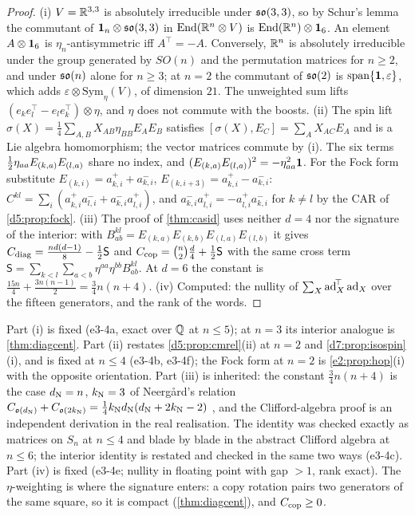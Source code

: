 \begin{proof}
(i) $V=\mathbb{R}^{3,3}$ is absolutely irreducible under $\mathfrak{so}(3,3)$, so by Schur's lemma the commutant of $\mathbf 1_n\otimes\mathfrak{so}(3,3)$ in $\operatorname{End}(\mathbb{R}^n\otimes V)$ is
$\operatorname{End}(\mathbb{R}^n)\otimes\mathbf 1_6$. An element $A\otimes\mathbf 1_6$ is $\eta_n$-antisymmetric iff $A^{\!\top}=-A$. Conversely, $\mathbb{R}^n$ is absolutely irreducible under
the group generated by $SO(n)$ and the permutation matrices for $n\ge2$, and under $\mathfrak{so}(n)$ alone for $n\ge3$; at $n=2$ the commutant of $\mathfrak{so}(2)$
is $\operatorname{span}\{\mathbf 1,\varepsilon\}$, which adds $\varepsilon\otimes\mathrm{Sym}_\eta(V)$, of dimension $21$. The unweighted sum lifts
$(e_ke_l^{\!\top}-e_le_k^{\!\top})\otimes\eta$, and $\eta$ does not commute with the boosts. (ii) The spin lift $\sigma(X)=\tfrac14\sum_{A,B}X_{AB}\eta_{BB}E_AE_B$
satisfies $[\sigma(X),E_C]=\sum_AX_{AC}E_A$ and is a Lie algebra homomorphism; the vector matrices commute by (i). The six terms
$\tfrac12\eta_{aa}E_{(k,a)}E_{(l,a)}$ share no index, and $(E_{(k,a)}E_{(l,a)})^2=-\eta_{aa}^2\mathbf 1$. For the Fock form substitute
$E_{(k,i)}=a^+_{k,i}+a^-_{k,i}$, $E_{(k,i+3)}=a^+_{k,i}-a^-_{k,i}$: $C^{kl}=\sum_i(a^+_{k,i}a^-_{l,i}+a^-_{k,i}a^+_{l,i})$, and $a^-_{k,i}a^+_{l,i}=-a^+_{l,i}a^-_{k,i}$ for
$k\ne l$ by the CAR of \cref{d5:prop:fock}. (iii) The proof of \cref{thm:casid} uses neither $d=4$ nor the signature of the
interior: with $B^{kl}_{ab}=E_{(k,a)}E_{(k,b)}E_{(l,a)}E_{(l,b)}$ it gives $C_{\rm diag}=\tfrac{nd(d-1)}8-\tfrac12\mathsf S$ and $C_{\rm cop}=\binom n2\tfrac d4+\tfrac12\mathsf S$
with the same cross term $\mathsf S=\sum_{k<l}\sum_{a<b}\eta^{aa}\eta^{bb}B^{kl}_{ab}$. At $d=6$ the constant is $\tfrac{15n}4+\tfrac{3n(n-1)}2=\tfrac34n(n+4)$.
(iv) Computed: the nullity of $\sum_X\operatorname{ad}_X^{\!\top}\operatorname{ad}_X$ over the fifteen generators, and the rank of the words.
\end{proof}

Part (i) is fixed (e3-4a, exact over $\mathbb{Q}$ at $n\le5$); at $n=3$ its interior analogue is \cref{thm:diagcent}. Part (ii) restates
\cref{d5:prop:cmrel}(ii) at $n=2$ and \cref{d7:prop:isospin}(i), and is fixed at $n\le4$ (e3-4b, e3-4f); the Fock form at $n=2$ is
\cref{e2:prop:hop}(i) with the opposite orientation. Part (iii) is inherited: the constant $\tfrac34n(n+4)$ is the case $d_{\rm N}=n$, $k_{\rm N}=3$ of Neerg{\aa}rd's
relation $C_{\mathfrak o(d_{\rm N})}+C_{\mathfrak o(2k_{\rm N})}=\tfrac14k_{\rm N}d_{\rm N}(d_{\rm N}+2k_{\rm N}-2)$ \cite[eq.~(73)]{Neergard19}, and the Clifford-algebra proof is an independent
derivation in the real realisation. The identity was checked exactly
as matrices on $S_n$ at $n\le4$ and blade by blade in the abstract Clifford algebra at $n\le6$; the interior identity is restated and checked in
the same two ways (e3-4c). Part (iv) is fixed (e3-4e; nullity in floating point with gap $>1$, rank exact). The $\eta$-weighting is where the
signature enters: a copy rotation pairs two generators of the same square, so it is compact (\cref{thm:diagcent}), and $C_{\rm cop}\ge0$.

